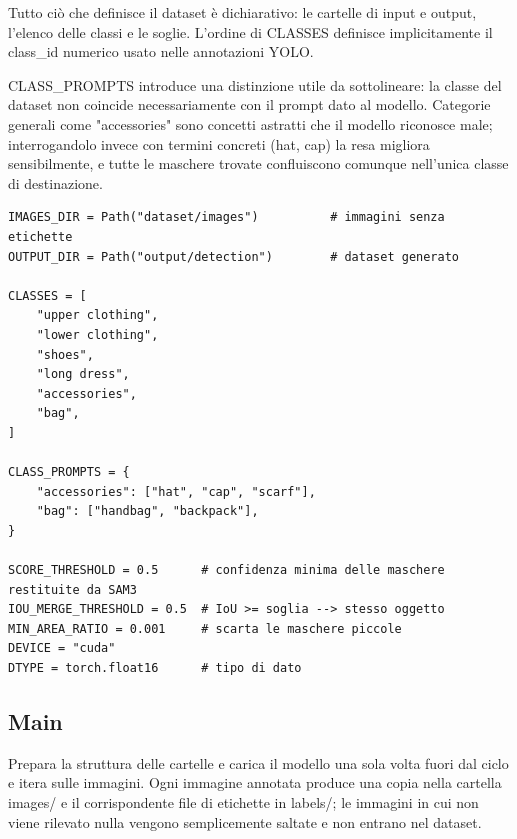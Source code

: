 Tutto ciò che definisce il dataset è dichiarativo: le cartelle di input e output, l'elenco delle classi e le soglie.
L'ordine di CLASSES definisce implicitamente il class\_id numerico usato nelle annotazioni YOLO.

CLASS\_PROMPTS introduce una distinzione utile da sottolineare: la classe del dataset non coincide necessariamente con il prompt dato al modello.
Categorie generali come "accessories" sono concetti astratti che il modello riconosce male; interrogandolo invece con termini concreti (hat, cap)
la resa migliora sensibilmente, e tutte le maschere trovate confluiscono comunque nell'unica classe di destinazione. \\

\begin{lstlisting}
IMAGES_DIR = Path("dataset/images")          # immagini senza etichette
OUTPUT_DIR = Path("output/detection")        # dataset generato

CLASSES = [
	"upper clothing",
	"lower clothing",
	"shoes",
	"long dress",
	"accessories",
	"bag",
]

CLASS_PROMPTS = {
	"accessories": ["hat", "cap", "scarf"],
	"bag": ["handbag", "backpack"],
}

SCORE_THRESHOLD = 0.5      # confidenza minima delle maschere restituite da SAM3
IOU_MERGE_THRESHOLD = 0.5  # IoU >= soglia --> stesso oggetto
MIN_AREA_RATIO = 0.001     # scarta le maschere piccole
DEVICE = "cuda"
DTYPE = torch.float16      # tipo di dato
\end{lstlisting}

\subsection{Main}

Prepara la struttura delle cartelle e carica il modello una sola volta fuori dal ciclo e itera sulle immagini.
Ogni immagine annotata produce una copia nella cartella images/ e il corrispondente file di etichette in labels/;
le immagini in cui non viene rilevato nulla vengono semplicemente saltate e non entrano nel dataset. \\

